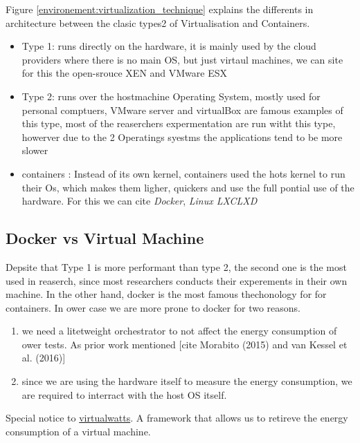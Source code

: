 Figure \ref{environement:virtualization_technique} explains the differents in architecture between the clasic types2 of Virtualisation and Containers.
\begin{itemize}
    \item Type 1: runs directly on the hardware, it is mainly used by the cloud providers where there is no main OS, but just virtaul machines, we can site for this the open-srouce XEN and VMware ESX
    \item Type 2: runs over the hostmachine Operating System, mostly used for personal comptuers, VMware server and virtualBox are famous examples of this type, most of the reaserchers expermentation are run witht this type, howerver due to the 2 Operatings syestms the applications tend to be more slower
    \item containers : Instead of its own kernel, containers used the hots kernel to run their Os, which makes them ligher, quickers and use the full pontial use of the hardware. For this we can cite \emph{Docker}, \emph{Linux LXC}\emph{LXD} \cite{abuabdo_virtualization_2019}
\end{itemize}


\subsection{Docker vs Virtual Machine}
Depsite that Type 1 is more performant than type 2, the second one is the most used in reaserch, since most researchers conducts their experements in their own machine. In the other hand, docker is the most famous thechonology for for containers.
In ower case we are more prone to docker for two reasons.
\begin{enumerate}
    \item we need a litetweight orchestrator to not affect the energy consumption of ower tests. As prior work mentioned [cite Morabito (2015) and van Kessel et al. (2016)]
    \item since we are using the hardware itself to measure the energy consumption, we are required to interract with the host OS itself.
\end{enumerate}
Special notice to \href{https://github.com/powerapi-ng/virtualwatts}{virtualwatts}. A framework that allows us to retireve the energy consumption of a virtual machine.
